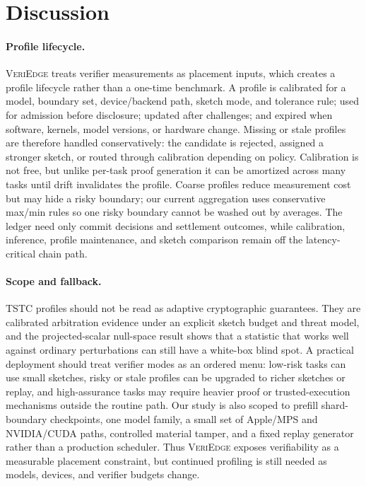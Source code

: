 \documentclass[sigplan,screen,review,anonymous]{acmart}
\newcommand{\system}{\textsc{VeriEdge}\xspace}
\begin{document}
\section{Discussion}
\label{sec:discussion}
\paragraph{Profile lifecycle.}
\system treats verifier measurements as placement inputs, which creates a
profile lifecycle rather than a one-time benchmark. A profile is calibrated
for a model, boundary set, device/backend path, sketch mode, and tolerance
rule; used for admission before disclosure; updated after challenges; and
expired when software, kernels, model versions, or hardware change. Missing or
stale profiles are therefore handled conservatively: the candidate is rejected,
assigned a stronger sketch, or routed through calibration depending on policy.
Calibration is not free, but unlike per-task proof generation it can be
amortized across many tasks until drift invalidates the profile. Coarse
profiles reduce measurement cost but may hide a risky boundary; our current
aggregation uses conservative max/min rules so one risky boundary cannot be
washed out by averages. The ledger need only commit decisions and settlement
outcomes, while calibration, inference, profile maintenance, and sketch
comparison remain off the latency-critical chain path.

\paragraph{Scope and fallback.}
TSTC profiles should not be read as adaptive cryptographic guarantees. They
are calibrated arbitration evidence under an explicit sketch budget and threat
model, and the projected-scalar null-space result shows that a statistic that
works well against ordinary perturbations can still have a white-box blind
spot. A practical deployment should treat verifier modes as an ordered menu:
low-risk tasks can use small sketches, risky or stale profiles can be upgraded
to richer sketches or replay, and high-assurance tasks may require heavier
proof or trusted-execution mechanisms outside the routine path. Our study is
also scoped to prefill shard-boundary checkpoints, one model family, a small
set of Apple/MPS and NVIDIA/CUDA paths, controlled material tamper, and a
fixed replay generator rather than a production scheduler. Thus \system
exposes verifiability as a measurable placement constraint, but continued
profiling is still needed as models, devices, and verifier budgets change.
\end{document}
